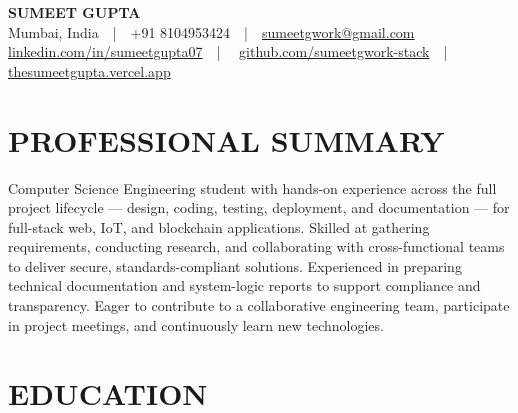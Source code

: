 \documentclass[letterpaper,11pt]{article}
\begin{document}
\begin{center}
  {\LARGE\bfseries\color{headingcolor} SUMEET GUPTA}\\[7pt]
  Mumbai, India~~|~~+91 8104953424~~|~~\href{mailto:sumeetgwork@gmail.com}{sumeetgwork@gmail.com}\\[2pt]
  \href{https://linkedin.com/in/sumeetgupta07}{linkedin.com/in/sumeetgupta07}~~|~~%
  \href{https://github.com/sumeetgwork-stack}{github.com/sumeetgwork-stack}~~|~~%
  \href{https://thesumeetgupta.vercel.app}{thesumeetgupta.vercel.app}
\end{center}

\vspace{-4pt}

\section{PROFESSIONAL SUMMARY}

Computer Science Engineering student with hands-on experience across the full project lifecycle — design, coding, testing, deployment, and documentation — for full-stack web, IoT, and blockchain applications. Skilled at gathering requirements, conducting research, and collaborating with cross-functional teams to deliver secure, standards-compliant solutions. Experienced in preparing technical documentation and system-logic reports to support compliance and transparency. Eager to contribute to a collaborative engineering team, participate in project meetings, and continuously learn new technologies.

\section{EDUCATION}
\end{document}
